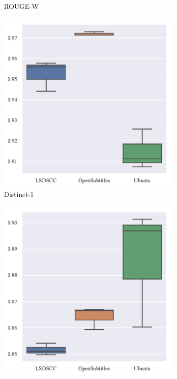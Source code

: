 \begin{figure}[H]
\begin{subfigure}{0.23\linewidth}
        \caption{ROUGE-W}
    \end{subfigure}
    \begin{subfigure}{0.23\linewidth}
        \centering
        \includegraphics[width=\linewidth]{figure/boxplot/dataset/distinct_1/plot.pdf}
        \caption{Distinct-1}
    \end{subfigure}%
    \begin{subfigure}{0.23\linewidth}
        \centering
        \includegraphics[width=\linewidth]{figure/boxplot/dataset/distinct_2/plot.pdf}

\end{subfigure}
\end{figure}
